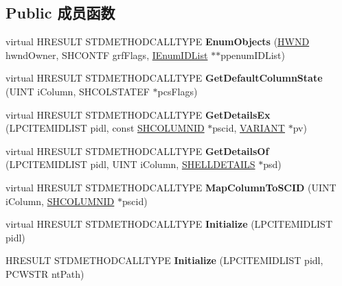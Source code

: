 \subsection*{Public 成员函数}
\begin{DoxyCompactItemize}
\item 
\mbox{\label{class_c_nt_object_folder_a4f9beb7b6e9e6921091d16555de0600f}} 
virtual H\+R\+E\+S\+U\+LT S\+T\+D\+M\+E\+T\+H\+O\+D\+C\+A\+L\+L\+T\+Y\+PE {\bfseries Enum\+Objects} (\hyperlink{interfacevoid}{H\+W\+ND} hwnd\+Owner, S\+H\+C\+O\+N\+TF grf\+Flags, \hyperlink{interface_i_enum_i_d_list}{I\+Enum\+I\+D\+List} $\ast$$\ast$ppenum\+I\+D\+List)
\item 
\mbox{\label{class_c_nt_object_folder_a6a63907ad178ab335f75b695728291d4}} 
virtual H\+R\+E\+S\+U\+LT S\+T\+D\+M\+E\+T\+H\+O\+D\+C\+A\+L\+L\+T\+Y\+PE {\bfseries Get\+Default\+Column\+State} (U\+I\+NT i\+Column, S\+H\+C\+O\+L\+S\+T\+A\+T\+EF $\ast$pcs\+Flags)
\item 
\mbox{\label{class_c_nt_object_folder_aa3836171943c3eda87b2c4a977fc538b}} 
virtual H\+R\+E\+S\+U\+LT S\+T\+D\+M\+E\+T\+H\+O\+D\+C\+A\+L\+L\+T\+Y\+PE {\bfseries Get\+Details\+Ex} (L\+P\+C\+I\+T\+E\+M\+I\+D\+L\+I\+ST pidl, const \hyperlink{struct_i_shell_folder2_1_1_s_h_c_o_l_u_m_n_i_d}{S\+H\+C\+O\+L\+U\+M\+N\+ID} $\ast$pscid, \hyperlink{structtag_v_a_r_i_a_n_t}{V\+A\+R\+I\+A\+NT} $\ast$pv)
\item 
\mbox{\label{class_c_nt_object_folder_ad95f75e048990a8ea9695ba51211bd01}} 
virtual H\+R\+E\+S\+U\+LT S\+T\+D\+M\+E\+T\+H\+O\+D\+C\+A\+L\+L\+T\+Y\+PE {\bfseries Get\+Details\+Of} (L\+P\+C\+I\+T\+E\+M\+I\+D\+L\+I\+ST pidl, U\+I\+NT i\+Column, \hyperlink{struct_s_h_e_l_l_d_e_t_a_i_l_s}{S\+H\+E\+L\+L\+D\+E\+T\+A\+I\+LS} $\ast$psd)
\item 
\mbox{\label{class_c_nt_object_folder_a1fe450b1e90ca839fa389d768bf67292}} 
virtual H\+R\+E\+S\+U\+LT S\+T\+D\+M\+E\+T\+H\+O\+D\+C\+A\+L\+L\+T\+Y\+PE {\bfseries Map\+Column\+To\+S\+C\+ID} (U\+I\+NT i\+Column, \hyperlink{struct_i_shell_folder2_1_1_s_h_c_o_l_u_m_n_i_d}{S\+H\+C\+O\+L\+U\+M\+N\+ID} $\ast$pscid)
\item 
\mbox{\label{class_c_nt_object_folder_af946b940f9dfa106cac443354efb717a}} 
virtual H\+R\+E\+S\+U\+LT S\+T\+D\+M\+E\+T\+H\+O\+D\+C\+A\+L\+L\+T\+Y\+PE {\bfseries Initialize} (L\+P\+C\+I\+T\+E\+M\+I\+D\+L\+I\+ST pidl)
\item 
\mbox{\label{class_c_nt_object_folder_ad3f9c98da6a1e7fa892c5a0cfa7a197f}} 
H\+R\+E\+S\+U\+LT S\+T\+D\+M\+E\+T\+H\+O\+D\+C\+A\+L\+L\+T\+Y\+PE {\bfseries Initialize} (L\+P\+C\+I\+T\+E\+M\+I\+D\+L\+I\+ST pidl, P\+C\+W\+S\+TR nt\+Path)
\end{DoxyCompactItemize}
